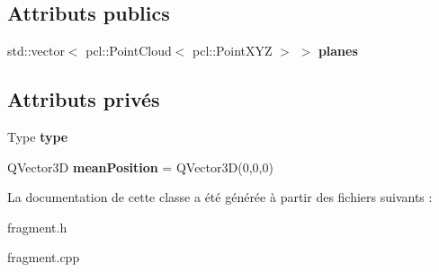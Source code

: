 \subsection*{Attributs publics}
\begin{DoxyCompactItemize}
\item 
\mbox{\label{classFragment_a94275a2ef93b9cbca8c7adbf7f87f807}} 
std\+::vector$<$ pcl\+::\+Point\+Cloud$<$ pcl\+::\+Point\+X\+YZ $>$ $>$ {\bfseries planes}
\end{DoxyCompactItemize}
\subsection*{Attributs privés}
\begin{DoxyCompactItemize}
\item 
\mbox{\label{classFragment_aa179c363d0738d2743957b5dfe0f89e5}} 
Type {\bfseries type}
\item 
\mbox{\label{classFragment_ae5fbd0eeacd1483f951612ff961c967d}} 
Q\+Vector3D {\bfseries mean\+Position} = Q\+Vector3D(0,0,0)
\end{DoxyCompactItemize}


La documentation de cette classe a été générée à partir des fichiers suivants \+:\begin{DoxyCompactItemize}
\item 
fragment.\+h\item 
fragment.\+cpp\end{DoxyCompactItemize}
